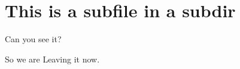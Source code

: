 \documentclass[../main.tex]{subfiles}
\begin{document}
\section {This is a subfile in a subdir}

Can you see it?

So we are Leaving it now. 
\end{document}
